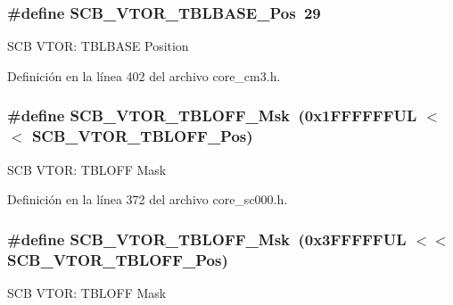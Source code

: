 \subsubsection[{\texorpdfstring{S\+C\+B\+\_\+\+V\+T\+O\+R\+\_\+\+T\+B\+L\+B\+A\+S\+E\+\_\+\+Pos}{SCB_VTOR_TBLBASE_Pos}}]{\setlength{\rightskip}{0pt plus 5cm}\#define S\+C\+B\+\_\+\+V\+T\+O\+R\+\_\+\+T\+B\+L\+B\+A\+S\+E\+\_\+\+Pos~29}\hypertarget{group___c_m_s_i_s___s_c_b_gad9720a44320c053883d03b883b955751}{}\label{group___c_m_s_i_s___s_c_b_gad9720a44320c053883d03b883b955751}
S\+CB V\+T\+OR\+: T\+B\+L\+B\+A\+SE Position 

Definición en la línea 402 del archivo core\+\_\+cm3.\+h.

\subsubsection[{\texorpdfstring{S\+C\+B\+\_\+\+V\+T\+O\+R\+\_\+\+T\+B\+L\+O\+F\+F\+\_\+\+Msk}{SCB_VTOR_TBLOFF_Msk}}]{\setlength{\rightskip}{0pt plus 5cm}\#define S\+C\+B\+\_\+\+V\+T\+O\+R\+\_\+\+T\+B\+L\+O\+F\+F\+\_\+\+Msk~(0x1\+F\+F\+F\+F\+F\+F\+U\+L $<$$<$ S\+C\+B\+\_\+\+V\+T\+O\+R\+\_\+\+T\+B\+L\+O\+F\+F\+\_\+\+Pos)}\hypertarget{group___c_m_s_i_s___s_c_b_ga75e395ed74042923e8c93edf50f0996c}{}\label{group___c_m_s_i_s___s_c_b_ga75e395ed74042923e8c93edf50f0996c}
S\+CB V\+T\+OR\+: T\+B\+L\+O\+FF Mask 

Definición en la línea 372 del archivo core\+\_\+sc000.\+h.

\subsubsection[{\texorpdfstring{S\+C\+B\+\_\+\+V\+T\+O\+R\+\_\+\+T\+B\+L\+O\+F\+F\+\_\+\+Msk}{SCB_VTOR_TBLOFF_Msk}}]{\setlength{\rightskip}{0pt plus 5cm}\#define S\+C\+B\+\_\+\+V\+T\+O\+R\+\_\+\+T\+B\+L\+O\+F\+F\+\_\+\+Msk~(0x3\+F\+F\+F\+F\+F\+U\+L $<$$<$ S\+C\+B\+\_\+\+V\+T\+O\+R\+\_\+\+T\+B\+L\+O\+F\+F\+\_\+\+Pos)}\hypertarget{group___c_m_s_i_s___s_c_b_ga75e395ed74042923e8c93edf50f0996c}{}\label{group___c_m_s_i_s___s_c_b_ga75e395ed74042923e8c93edf50f0996c}
S\+CB V\+T\+OR\+: T\+B\+L\+O\+FF Mask 

